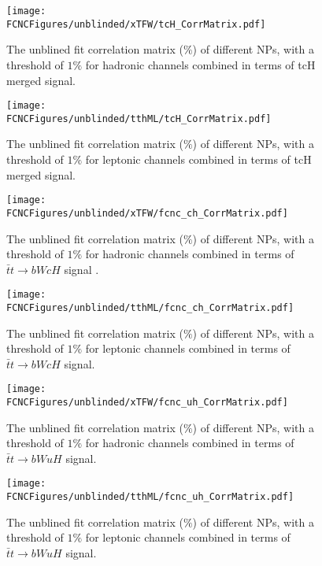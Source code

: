 \begin{figure}[H]
\centering
\texttt{[image: \\FCNCFigures/unblinded/xTFW/tcH\_CorrMatrix.pdf]}
\caption{ The unblined fit correlation matrix ($\%$) of different NPs, with a threshold of $1\%$ for hadronic channels combined in terms of tcH merged signal.}
\label{fig:tcH_CorrMatrix_1}
\end{figure}

\begin{figure}[H]
\centering
\texttt{[image: \\FCNCFigures/unblinded/tthML/tcH\_CorrMatrix.pdf]}
\caption{ The unblined fit correlation matrix ($\%$) of different NPs, with a threshold of $1\%$ for leptonic channels combined in terms of tcH merged signal.}
\label{fig:tcH_CorrMatrix_2}
\end{figure}


\begin{figure}[H]
\centering
\texttt{[image: \\FCNCFigures/unblinded/xTFW/fcnc\_ch\_CorrMatrix.pdf]}
\caption{ The unblined fit correlation matrix ($\%$) of different NPs, with a threshold of $1\%$ for hadronic channels combined in terms of $\bar{t}t\to bWcH$ signal . }
\label{fig:fcnc_ch_CorrMatrix_1}
\end{figure}

\begin{figure}[H]
\centering
\texttt{[image: \\FCNCFigures/unblinded/tthML/fcnc\_ch\_CorrMatrix.pdf]}
\caption{ The unblined fit correlation matrix ($\%$) of different NPs, with a threshold of $1\%$ for  leptonic channels combined in terms of $\bar{t}t\to bWcH$ signal. }
\label{fig:fcnc_ch_CorrMatrix_2}
\end{figure}


\begin{figure}[H]
\centering
\texttt{[image: \\FCNCFigures/unblinded/xTFW/fcnc\_uh\_CorrMatrix.pdf]}
\caption{ The unblined fit correlation matrix ($\%$) of different NPs, with a threshold of $1\%$ for hadronic channels combined in terms of $\bar{t}t\to bWuH$ signal.}
\label{fig:fcnc_uh_CorrMatrix_1}
\end{figure}



\begin{figure}[H]
\centering
\texttt{[image: \\FCNCFigures/unblinded/tthML/fcnc\_uh\_CorrMatrix.pdf]}
\caption{ The unblined fit correlation matrix ($\%$) of different NPs, with a threshold of $1\%$ for  leptonic channels combined in terms of $\bar{t}t\to bWuH$ signal.}
\label{fig:fcnc_uh_CorrMatrix_2}
\end{figure}




